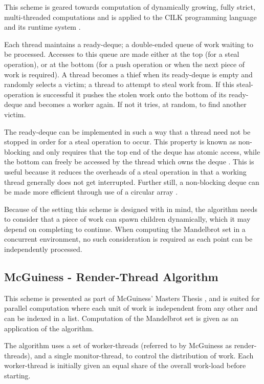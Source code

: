 This scheme is geared towards computation of dynamically growing, fully strict, multi-threaded computations and is applied to the CILK
programming language and its runtime system \cite{blumleis}. 

Each thread maintains a \gls{ready-deque}; a double-ended queue of work waiting to be processed. 
Accesses to this queue are made either at the top (for a steal operation), or at the bottom (for a push operation
or when the next piece of work is required).
A thread becomes a thief when its ready-deque is empty and randomly selects a victim; a thread
to attempt to steal work from. If this \gls{steal-operation} is successful it pushes the stolen work 
onto the bottom of its ready-deque and becomes a worker again. If not it tries, at random, to find another victim.

The ready-deque can be implemented in such a way that a thread need not be stopped in order for a steal operation 
to occur. This property is known as \gls{non-blocking} and only requires that the top end of the deque has atomic access,
while the bottom can freely be accessed by the thread which owns the deque \cite{narora}. This is useful because it reduces the overheads 
of a steal operation in that a working thread generally does not get interrupted. 
Further still, a non-blocking deque can be made more efficient through use of a \gls{circular array} \cite{circdeque}.

Because of the setting this scheme is designed with in mind, the algorithm needs to consider that
a piece of work can spawn children dynamically, which it may depend on completing to continue. 
When computing the Mandelbrot set in a concurrent environment, no such consideration is required 
as each point can be independently processed.

\subsection{McGuiness - Render-Thread Algorithm}
\label{sec:rendscheme}

This scheme is presented as part of McGuiness' Masters Thesis \cite{jmcguin}, and is suited for parallel computation where each unit of work is independent 
from any other and can be indexed in a list. Computation of the Mandelbrot set is given as an application of the algorithm. 

The algorithm uses a set of \glspl{worker-thread} (referred to by McGuiness as render-threads), 
and a single \gls{monitor-thread}, to control the distribution of work. Each \gls{worker-thread} is
initially given an equal share of the overall work-load before starting.

